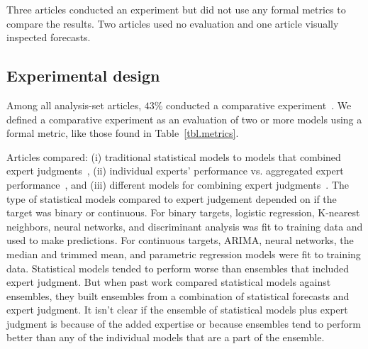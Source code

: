\documentclass[preprint,authoryear,nonatbib]{elsarticle}
\begin{document}
Three articles conducted an experiment but did not use any formal metrics to compare the results.
Two articles used no evaluation and one article visually inspected forecasts.

\subsection{Experimental design}

Among all analysis-set articles, $43$\% conducted a comparative experiment~\parencite{mak1996aggregating,hurley2002combining,petrovic2006fuzzy,bolger2017deriving,graefe2014accuracy,morales2017characterization,cai2016simple,hanea2018value,huang2016improving,graefe2015accuracy,satopaa2014probability,graefe2018predicting,alho1992estimating,jana2019interval,ren2002optimal,baldwin2015weighting,baecke2017investigating,seifert2013relative,graefe2014combining,alvarado2017expertise,hora2013median,franses2011averaging,craig2001bayesian}.
We defined a comparative experiment as an evaluation of two or more models using a formal metric, like those found in Table~\ref{tbl.metrics}.

Articles compared: (i) traditional statistical models to models that combined expert judgments~\parencite{petrovic2006fuzzy,graefe2014accuracy,morales2017characterization,hanea2018value}, (ii) individual experts' performance vs. aggregated expert performance~\parencite{graefe2015accuracy,graefe2018predicting,graefe2014combining,graefe2014accuracy,bolger2017deriving}, and (iii) different models for combining expert judgments~\parencite{hurley2002combining,mak1996aggregating,satopaa2014probability,jana2019interval,baldwin2015weighting,baecke2017investigating,seifert2013relative,hora2013median,craig2001bayesian}.
The type of statistical models compared to expert judgement depended on if the target was binary or continuous.
For binary targets, logistic regression, K-nearest neighbors, neural networks, and discriminant analysis was fit to training data and used to make predictions.
For continuous targets, ARIMA, neural networks, the median and trimmed mean, and parametric regression models were fit to training data.
Statistical models tended to perform worse than ensembles that included expert judgment.
But when past work compared statistical models against ensembles, they built ensembles from a combination of statistical forecasts and expert judgment.
It isn't clear if the ensemble of statistical models plus expert judgment is because of the added expertise or because ensembles tend to perform better than any of the individual models that are a part of the ensemble.
\end{document}
